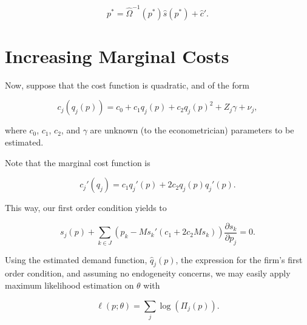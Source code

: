 \documentclass[cm,linguex]{glossa}
\theoremstyle{defn}
\theoremstyle{axiom}
\theoremstyle{thm}
\theoremstyle{lem}
\theoremstyle{cor}
\theoremstyle{prop}
\theoremstyle{rmk}
\begin{document}
\[ p^* = \hat{\Omega}^{-1} (p^*) \hat{s}(p^*) + \hat{c}'. \]

\newpage

\hypertarget{increasing-marginal-costs}{%
\section{Increasing Marginal Costs}\label{increasing-marginal-costs}}

Now, suppose that the cost function is quadratic, and of the form

\[ c_j\left(q_j(p)\right) = c_0 + c_1q_j(p) + c_2q_j(p)^2 + Z_j\gamma + \nu_j , \]

where \(c_0\), \(c_1\), \(c_2\), and \(\gamma\) are unknown (to the
econometrician) parameters to be estimated.

Note that the marginal cost function is

\[ c_j'(q_j) = c_1 q_j'(p) + 2c_2q_j(p)q_j'(p). \]

This way, our first order condition yields to

\[ s_j(p) + \sum_{k \in J} (p_k - M s_k' (c_1 + 2 c_2 M s_k)) \frac{\partial s_k}{\partial p_j} = 0. \]

Using the estimated demand function, \(\hat q_j(p)\), the expression for
the firm's first order condition, and assuming no endogeneity concerns,
we may easily apply maximum likelihood estimation on \(\theta\) with

\[ \ell(p; \theta) = \sum_j \log(\Pi_j(p)). \]

\newpage


\end{document}
